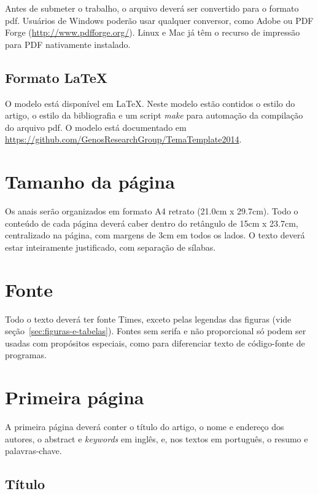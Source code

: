\documentclass[12pt]{article}
\begin{document}
Antes de submeter o trabalho, o arquivo deverá ser convertido para o
formato pdf. Usuários de Windows poderão usar qualquer conversor, como
Adobe ou PDF Forge (\url{http://www.pdfforge.org/}). Linux e Mac já
têm o recurso de impressão para PDF nativamente instalado.

\subsection{Formato \LaTeX}
\label{sec:latex}

O modelo está disponível em \LaTeX{}. Neste modelo estão contidos o
estilo do artigo, o estilo da bibliografia e um script \textit{make}
para automação da compilação do arquivo pdf. O modelo está documentado
em \url{https://github.com/GenosResearchGroup/TemaTemplate2014}.

\section{Tamanho da página}
\label{sec:tamanho-pagina}

Os anais serão organizados em formato A4 retrato (21.0cm x 29.7cm).
Todo o conteúdo de cada página deverá caber dentro do retângulo de
15cm x 23.7cm, centralizado na página, com margens de 3cm em todos os
lados. O texto deverá estar inteiramente justificado, com separação de
sílabas.

\section{Fonte}
\label{sec:fonte}

Todo o texto deverá ter fonte Times, exceto pelas legendas das figuras
(vide seção~\ref{sec:figuras-e-tabelas}). Fontes sem serifa e não
proporcional só podem ser usadas com propósitos especiais, como para
diferenciar texto de código-fonte de programas.

\section{Primeira página}

A primeira página deverá conter o título do artigo, o nome e endereço
dos autores, o abstract e \textit{keywords} em inglês, e, nos textos
em português, o resumo e palavras-chave.

\subsection{Título}
\label{sec:titulo}
\end{document}
